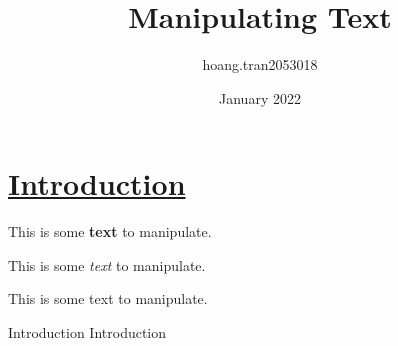 \documentclass{article}
\title{{\color{red} {\sqrcfamily Manipulating Text}}}
\author{\Huge hoang.tran2053018}
\date{January 2022}
\begin{document}
\maketitle

\section*{\underline{\ttfamily Introduction}}
{\small This} is some \textbf{text} to manipulate.

This is some \textit{text} to {\sffamily manipulate}.

{\huge This} is some text to {\ttfamily manipulate}. %

\textcolor{mynewcolor}{Introduction}
\textcolor{color2}{Introduction}
\end{document}
